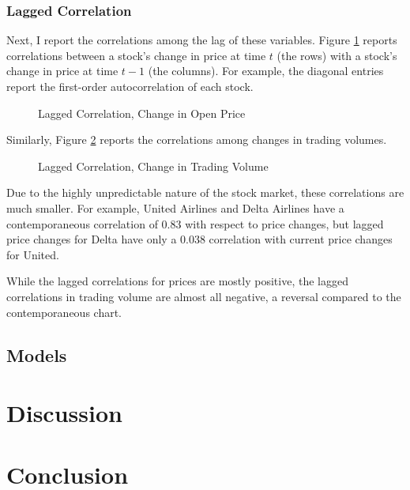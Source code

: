 \documentclass[12pt]{article}
\begin{document}
\subsubsection{Lagged Correlation}
Next, I report the correlations among the lag of these variables. Figure \ref{fig:lagged_open} reports correlations between a stock's change in price at time $t$ (the rows) with a stock's change in price at time $t-1$ (the columns). For example, the diagonal entries report the first-order autocorrelation of each stock.
\begin{figure}[H]
    \centering
    \caption{Lagged Correlation, Change in Open Price}
    \label{fig:lagged_open}
\end{figure}
Similarly, Figure \ref{fig:lagged_volume} reports the correlations among changes in trading volumes.
\begin{figure}[H]
    \centering
    \caption{Lagged Correlation, Change in Trading Volume}
    \label{fig:lagged_volume}
\end{figure}
Due to the highly unpredictable nature of the stock market, these correlations are much smaller. For example, United Airlines and Delta Airlines have a contemporaneous correlation of 0.83 with respect to price changes, but lagged price changes for Delta have only a 0.038 correlation with current price changes for United.

While the lagged correlations for prices are mostly positive, the lagged correlations in trading volume are almost all negative, a reversal compared to the contemporaneous chart.


\subsection{Models}

\newpage
\section{Discussion}

\section{Conclusion}

\newpage
\printbibliography
\end{document}
